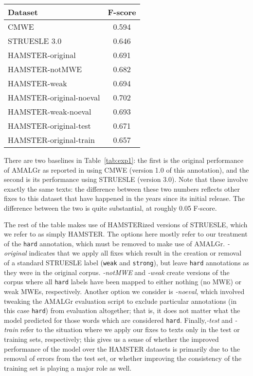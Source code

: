 \documentclass[output=paper
,modfonts
,nonflat]{langsci/langscibook}
\newcommand{\mwetype}[1]{\texttt{#1}\xspace}
\newcommand{\strongish}{\mwetype{strong}}
\newcommand{\weak}{\mwetype{weak}}
\newcommand{\hard}{\mwetype{hard}}
\newcommand{\tableref}[1]{Table~\ref{#1}\xspace}
\begin{document}
\begin{table*}[t!]
\caption{AMALGr F-scores for various versions of MWE annotation of EWT Reviews} %
\begin{tabular}{l c}
\toprule
\textbf{Dataset}&\textbf{F-score}\\
\midrule
CMWE \citep{Schneider14b} & 0.594\\
STRUESLE 3.0 & 0.646 \\
\midrule
HAMSTER-original & 0.691 \\ 
HAMSTER-notMWE & 0.682 \\
HAMSTER-weak & 0.694 \\
\midrule
HAMSTER-original-noeval & 0.702 \\
HAMSTER-weak-noeval & 0.693\\
\midrule
HAMSTER-original-test & 0.671\\
HAMSTER-original-train  & 0.657 \\

\bottomrule
\end{tabular}%
\label{tab:exp1} %
\end{table*}

There are two baselines in \tableref{tab:exp1}: the first is the original performance of AMALGr as reported in \citet{Schneider14b} using CMWE (version 1.0 of this annotation), and the second is its performance using STRUESLE (version 3.0). Note that these involve exactly the same texts: the difference between these two numbers reflects other fixes to this dataset that have happened in the years since its initial release. The difference between the two is quite substantial, at roughly 0.05 F-score.

The rest of the table makes use of HAMSTERized versions of STRUESLE, which we refer to as simply HAMSTER. The options here mostly refer to our treatment of the \hard annotation, which must be removed to make use of AMALGr. \emph{-original} indicates that we apply all fixes which result in the creation or removal of a standard STRUESLE label (\ie \weak and \strongish), but leave \hard annotations as they were in the original corpus. \emph{-notMWE} and \emph{-weak} create versions of the corpus where all \hard labels have been mapped to either nothing (no MWE) or weak MWEs, respectively. Another option we consider is \emph{-noeval}, which involved tweaking the AMALGr evaluation script to exclude particular annotations (in this case \hard) from evaluation altogether; that is, it does not matter what the model predicted for those words which are considered \hard. Finally,\emph{-test} and \emph{-train} refer to the situation where we apply our fixes to texts only in the test or training sets, respectively; this gives us a sense of whether the improved performance of the model over the HAMSTER datasets is primarily due to the removal of errors from the test set, or whether improving the consistency of the training set is playing a major role as well.
\end{document}
